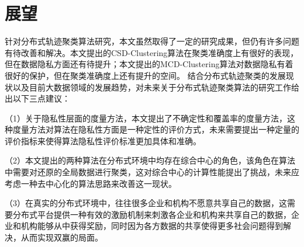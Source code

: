 \section{展望}

针对分布式轨迹聚类算法研究，本文虽然取得了一定的研究成果，但仍有许多问题有待改善和解决。本文提出的CSD-Clustering算法在聚类准确度上有很好的表现，但在数据隐私方面还有待提升；本文提出的MCD-Clustering算法对数据隐私有着很好的保护，但在聚类准确度上还有提升的空间。
结合分布式轨迹聚类的发展现状以及目前大数据领域的发展趋势，对未来关于分布式轨迹聚类算法的研究工作给出以下三点建议：

（1）关于隐私性层面的度量方法，本文提出了不确定性和覆盖率的度量方法，这种度量方法对算法在隐私性方面是一种定性的评价方式，未来需要提出一种定量的评价指标来使得算法隐私性评价标准更加具体和准确。

（2）本文提出的两种算法在分布式环境中均存在综合中心的角色，该角色在算法中需要对还原的全局数据进行聚类，这对综合中心的计算性能提出了挑战，未来应考虑一种去中心化的算法思路来改善这一现状。

（3）在真实的分布式环境中，往往很多企业和机构不愿意共享自己的数据，这需要分布式平台提供一种有效的激励机制来刺激各企业和机构来共享自己的数据，企业和机构能够从中获得奖励，同时因为各方数据的共享使得更多社会问题得到解决，从而实现双赢的局面。


